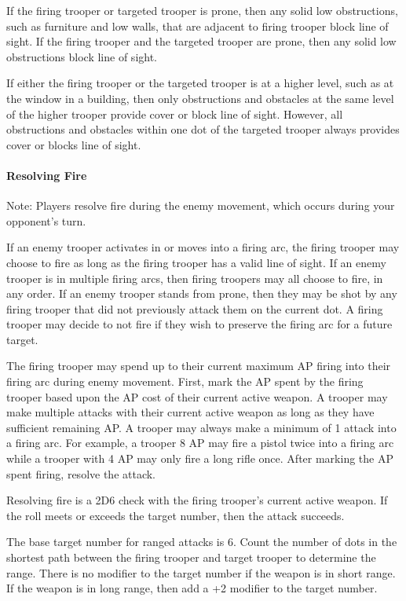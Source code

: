 If the firing trooper or targeted trooper is prone, then any solid low obstructions, such as furniture and low walls, that are adjacent to firing trooper block line of sight.
If the firing trooper and the targeted trooper are prone, then any solid low obstructions block line of sight.

If either the firing trooper or the targeted trooper is at a higher level, such as at the window in a building, then only obstructions and obstacles at the same level of the higher trooper provide cover or block line of sight.
However, all obstructions and obstacles within one dot of the targeted trooper always provides cover or blocks line of sight.

\paragraph*{Resolving Fire}

Note: Players resolve fire during the enemy movement, which occurs during your opponent's turn.

If an enemy trooper activates in or moves into a firing arc, the firing trooper may choose to fire as long as the firing trooper has a valid line of sight.
If an enemy trooper is in multiple firing arcs, then firing troopers may all choose to fire, in any order.
If an enemy trooper stands from prone, then they may be shot by any firing trooper that did not previously attack them on the current dot.
A firing trooper may decide to not fire if they wish to preserve the firing arc for a future target.

The firing trooper may spend up to their current maximum AP firing into their firing arc during enemy movement.
First, mark the AP spent by the firing trooper based upon the AP cost of their current active weapon.
A trooper may make multiple attacks with their current active weapon as long as they have sufficient remaining AP.
A trooper may always make a minimum of 1 attack into a firing arc.
For example, a trooper 8 AP may fire a pistol twice into a firing arc while a trooper with 4 AP may only fire a long rifle once.
After marking the AP spent firing, resolve the attack.

Resolving fire is a 2D6 check with the firing trooper's current active weapon.
If the roll meets or exceeds the target number, then the attack succeeds.

The base target number for ranged attacks is 6.
Count the number of dots in the shortest path between the firing trooper and target trooper to determine the range.
There is no modifier to the target number if the weapon is in short range.
If the weapon is in long range, then add a +2 modifier to the target number.

